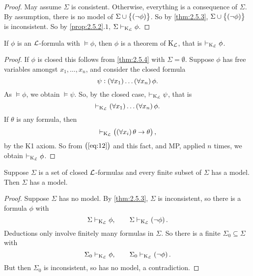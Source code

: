 \begin{proof}
May assume $ \Sigma $ is consistent. Otherwise, everything is a consequence of $ \Sigma $. By assumption, there is no model of $ \Sigma \cup \cbr{\notb{\phi}} $. So by \ref{thm:2.5.3}, $ \Sigma \cup \cbr{\notb{\phi}} $ is inconsistent. So by \ref{prop:2.5.2}.$ 1 $, $ \Sigma \vdash_{\mathrm{K}_{\mathcal{L}}} \phi $.
\end{proof}

\begin{theorem}
If $ \phi $ is an $ \mathcal{L} $-formula with $ \vDash \phi $, then $ \phi $ is a theorem of $ \mathrm{K}_{\mathcal{L}} $, that is $ \vdash_{\mathrm{K}_{\mathcal{L}}} \phi $.
\end{theorem}

\begin{proof}
If $ \phi $ is closed this follows from \ref{thm:2.5.4} with $ \Sigma = \emptyset $. Suppose $ \phi $ has free variables amongst $ x_1, \dots, x_n $, and consider the closed formula
$$ \psi : \fab{x_1} \dots \fab{x_n}\phi. $$
As $ \vDash \phi $, we obtain $ \vDash \psi $. So, by the closed case, $ \vdash_{\mathrm{K}_{\mathcal{L}}} \psi $, that is
\begin{equation}
\label{eq:12}
\vdash_{\K_\LLL} \fab{x_1} \dots \fab{x_n}\phi.
\end{equation}
If $ \theta $ is any formula, then
$$ \vdash_{\K_\LLL} \impb{\fab{x_i}\theta}{\theta}, $$
by the K1 axiom. So from $ \br{\ref{eq:12}} $ and this fact, and MP, applied $ n $ times, we obtain $ \vdash_{\mathrm{K}_{\mathcal{L}}} \phi $.
\end{proof}

\pagebreak

\begin{corollary}
\label{cor:2.5.6}
Suppose $ \Sigma $ is a set of closed $ \mathcal{L} $-formulas and every finite subset of $ \Sigma $ has a model. Then $ \Sigma $ has a model.
\end{corollary}

\begin{proof}
Suppose $ \Sigma $ has no model. By \ref{thm:2.5.3}, $ \Sigma $ is inconsistent, so there is a formula $ \phi $ with
$$ \Sigma \vdash_{\K_\LLL} \phi, \qquad \Sigma \vdash_{\K_\LLL} \notb{\phi}. $$ Deductions only involve finitely many formulas in $ \Sigma $. So there is a finite $ \Sigma_0 \subseteq \Sigma $ with
$$ \Sigma_0 \vdash_{\K_\LLL} \phi, \qquad \Sigma_0 \vdash_{\K_\LLL} \notb{\phi}. $$
But then $ \Sigma_0 $ is inconsistent, so has no model, a contradiction.
\end{proof}

